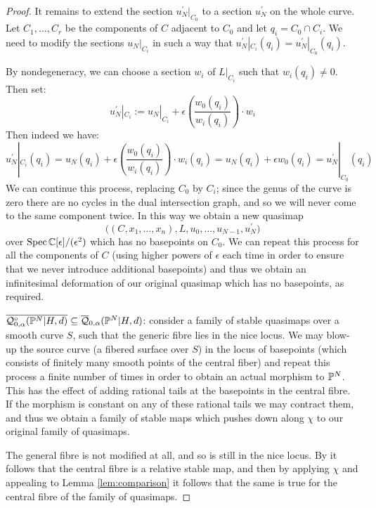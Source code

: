 \begin{proof}
It remains to extend the section $u_N^\prime|_{C_0}$ to a section $u_N^\prime$ on the whole curve. Let $C_1, \ldots, C_r$ be the components of $C$ adjacent to $C_0$ and let $q_i = C_0 \cap C_i$. We need to modify the sections $u_N|_{C_i}$ in such a way that $u_N^\prime|_{C_i}(q_i) = u_N^\prime|_{C_0}(q_i)$.

By nondegeneracy, we can choose a section $w_i$ of $L|_{C_i}$ such that $w_i(q_i) \neq 0$. Then set:
\begin{equation*} {u_N^\prime}|_{C_i} := {u_N}|_{C_i} + \epsilon \left( \frac{w_0(q_i)}{w_i(q_i)} \right) \cdot w_i \end{equation*}
Then indeed we have:
\begin{equation*} {u_N^\prime}|_{C_i}(q_i) = u_N(q_i) + \epsilon \left( \frac{w_0(q_i)}{w_i(q_i)} \right) \cdot w_i(q_i) = u_N(q_i) + \epsilon w_0(q_i) = {u_N^\prime}|_{C_0}(q_i) \end{equation*}
We can continue this process, replacing $C_0$ by $C_i$; since the genus of the curve is zero there are no cycles in the dual intersection graph, and so we will never come to the same component twice. In this way we obtain a new quasimap
\begin{equation*} \big((C,x_1,\ldots,x_n),L,u_0, \ldots, u_{N-1}, u_N^\prime\big) \end{equation*}
over $\operatorname{Spec} \mathbb{C}[\epsilon]/(\epsilon^2)$ which has no basepoints on $C_0$. We can repeat this process for all the components of $C$ (using higher powers of $\epsilon$ each time in order to ensure that we never introduce additional basepoints) and thus we obtain an infinitesimal deformation of our original quasimap which has no basepoints, as required.

$\overline{\mathcal{Q}^{\circ}_{0,\alpha}(\mathbb P^N|H,d)}\subseteq\overline{\mathcal Q}_{0,\alpha}(\mathbb P^N|H,d)$: consider a family of stable quasimaps over a smooth curve $S$, such that the generic fibre lies in the nice locus. We may  blow-up the source curve (a fibered surface over $S$) in the locus of basepoints (which consists of finitely many smooth points of the central fiber) and repeat this process a finite number of times in order to obtain an actual morphism to $\mathbb P^N$. This has the effect of adding rational tails at the basepoints in the central fibre. If the morphism is constant on any of these rational tails we may contract them, and thus we obtain a family of stable maps which pushes down along $\chi$ to our original family of quasimaps.

The general fibre is not modified at all, and so is still in the nice locus. By \cite[Lemma 1.9]{Ga} it follows that the central fibre is a relative stable map, and then by applying $\chi$ and appealing to Lemma \ref{lem:comparison} it follows that the same is true for the central fibre of the family of quasimaps.
\end{proof}

